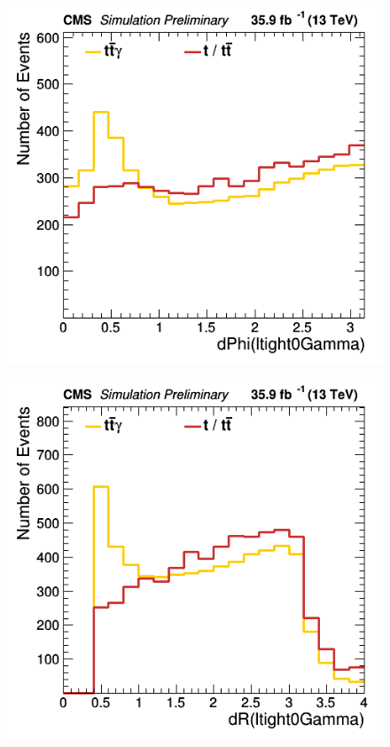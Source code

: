 \documentclass[11pt]{scrartcl}
\begin{document}
	\begin{figure}[H]
	\centering
	\begin{minipage}{.5\textwidth}
	  \centering
	  \includegraphics[width=0.75\linewidth]{figures/Select3/ltight0GammadPhi.png}
	  \label{fig:ltight0GammadPhi}
	\end{minipage}%
	\begin{minipage}{.5\textwidth}
	  \centering
	  \includegraphics[width=0.75\linewidth]{figures/Select3/ltight0GammadR.png}
	  \label{fig:ltight0GammadR}
	\end{minipage}
	\end{figure}
	
\end{document}
